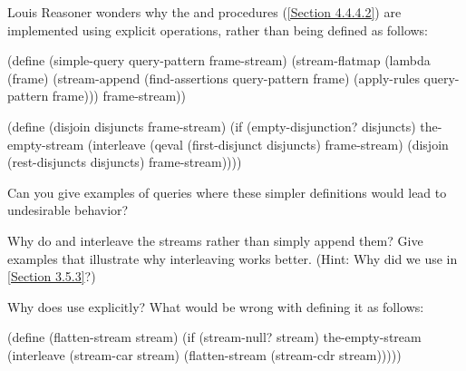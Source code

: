\begin{exercise}
	\label{Exercise 4.71}
	Louis Reasoner wonders why the  and  procedures (\cref{Section 4.4.4.2}) are implemented using explicit  operations, rather than being defined as follows:
	\begin{scheme}
	  (define (simple-query query-pattern frame-stream)
	    (stream-flatmap
	     (lambda (frame)
	       (stream-append
	        (find-assertions query-pattern frame)
	        (apply-rules query-pattern frame)))
	     frame-stream))

	  (define (disjoin disjuncts frame-stream)
	    (if (empty-disjunction? disjuncts)
	        the-empty-stream
	        (interleave
	         (qeval (first-disjunct disjuncts)
	                frame-stream)
	         (disjoin (rest-disjuncts disjuncts)
	                  frame-stream))))
	\end{scheme}
	Can you give examples of queries where these simpler definitions would lead to
	undesirable behavior?
\end{exercise}



\begin{exercise}
	\label{Exercise 4.72}
	Why do  and  interleave the streams rather than simply append them?
	Give examples that illustrate why interleaving works better.
	(Hint: Why did we use  in \cref{Section 3.5.3}?)
\end{exercise}

\begin{exercise}
	\label{Exercise 4.73}
	Why does  use  explicitly?
	What would be wrong with defining it as follows:
	\begin{scheme}
	  (define (flatten-stream stream)
	    (if (stream-null? stream)
	        the-empty-stream
	        (interleave
	         (stream-car stream)
	         (flatten-stream (stream-cdr stream)))))
	\end{scheme}
\end{exercise}



